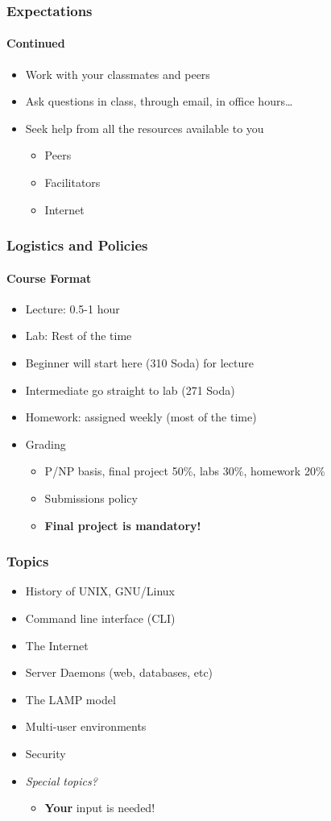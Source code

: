 \documentclass[14pt]{beamer}
\begin{document}
\begin{frame}
  \frametitle{Expectations}
  \framesubtitle{Continued}
  \begin{itemize}
  	\item Work with your classmates and peers
		\item Ask questions in class, through email, in office hours\ldots
		\item Seek help from all the resources available to you
		\begin{itemize}
		  \item Peers
		  \item Facilitators
		  \item Internet
		\end{itemize}
	\end{itemize}
\end{frame}

\begin{frame}
	\frametitle{Logistics and Policies}
	\framesubtitle{Course Format}
	\begin{itemize}
		\item Lecture: 0.5-1 hour
		\item Lab: Rest of the time
    \item Beginner will start here (310 Soda) for lecture
    \item Intermediate go straight to lab (271 Soda)	
		\item Homework: assigned weekly (most of the time)
		\item Grading
		\begin{itemize}
			\item P/NP basis, final project 50\%, labs 30\%, homework 20\%
			\item Submissions policy
			\item \textbf{Final project is mandatory!}
		\end{itemize}
	\end{itemize}
\end{frame}

\begin{frame}
	\frametitle{Topics}
	\begin{itemize}
		\item History of UNIX, GNU/Linux
		\item Command line interface (CLI)
		\item The Internet
		\item Server Daemons (web, databases, etc)
		\item The LAMP model
		\item Multi-user environments
		\item Security
		\item \emph{Special topics?}
		\begin{itemize}
		  \item \textbf{Your} input is needed!
		\end{itemize}
	\end{itemize}
\end{frame}
\end{document}
